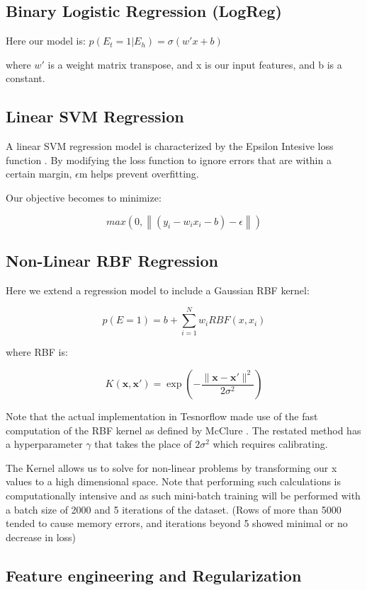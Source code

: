 \subsection{Binary Logistic Regression (LogReg)}

Here our model is:
$p(E_t = 1 | E_h) =  \sigma(w'x + b)$

where $w'$ is a weight matrix transpose, and x is our input features, and b is a constant. 

\subsection{Linear SVM Regression}

A linear SVM regression model is characterized by the Epsilon Intesive loss function \parencite{Vapnik}. By modifying the loss function to ignore errors that are within a certain margin, $\epsilon$m helps prevent overfitting.

Our objective becomes to minimize:

$$max(0,\left\| (y_i - w_i x_i - b) - \epsilon \right\|)$$


\subsection{Non-Linear RBF Regression}

Here we extend a regression model to include a Gaussian RBF kernel:

$$p(E=1)=b+\sum^N_{i=1}w_iRBF(x,x_i)$$

where RBF is:

$$K(\mathbf {x} ,\mathbf {x'} )=\exp \left(-{\frac {\|\mathbf {x} -\mathbf {x'} \|^{2}}{2\sigma ^{2}}}\right)$$

Note that the actual implementation in Tesnorflow made use of the fast computation of the RBF kernel as defined by McClure \parencite{TFCookbook}. The restated method has a hyperparameter $\gamma$ that takes the place of $2\sigma^2$ which requires calibrating.

The Kernel allows us to solve for non-linear problems by transforming our x values to a high dimensional space. Note that performing such calculations is computationally intensive and as such mini-batch training will be performed with a batch size of 2000 and 5 iterations of the dataset. (Rows of more than 5000 tended to cause memory errors, and iterations beyond 5 showed minimal or no decrease in loss)

\subsection{Feature engineering and Regularization}

